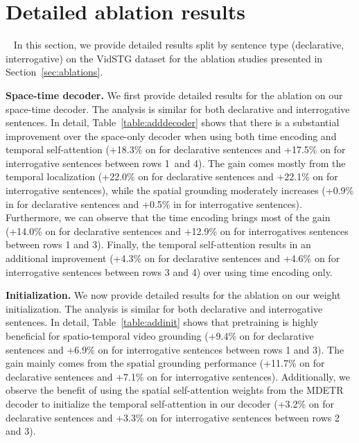 \section{Detailed ablation results}~\label{sec:addablation}
In this section, we provide detailed results split by sentence type (declarative, interrogative) on the VidSTG dataset for the ablation studies presented in Section~\ref{sec:ablations}.

\noindent \textbf{Space-time decoder.}\label{sec:adddecoderres}
We first provide detailed results for the ablation on our space-time decoder. 
The analysis is similar for both declarative and interrogative sentences.
In detail, Table~\ref{table:adddecoder} shows that there is a substantial improvement over the space-only decoder when using both time encoding and temporal self-attention (+18.3\% on  for declarative sentences and +17.5\% on  for interrogative sentences between rows 1~and 4). 
The gain comes mostly from the temporal localization (+22.0\% on  for declarative sentences and +22.1\% on  for interrogative sentences), while the spatial grounding moderately increases (+0.9\% in  for declarative sentences and +0.5\% in  for interrogative sentences). 
Furthermore, we can observe that the time encoding brings most of the gain (+14.0\% on  for declarative sentences and +12.9\% on  for interrogatives sentences between rows 1 and 3).
Finally, the temporal self-attention results in an additional improvement (+4.3\% on  for declarative sentences and +4.6\% on  for interrogative sentences between rows 3 and 4) over using time encoding only. 

\noindent \textbf{Initialization.}\label{sec:addinit}
We now provide detailed results for the ablation on our weight initialization.
The analysis is similar for both declarative and interrogative sentences.
In detail, Table~\ref{table:addinit} shows that pretraining is highly beneficial for spatio-temporal video grounding (+9.4\% on  for declarative sentences and +6.9\% on  for interrogative sentences between rows 1 and 3). 
The gain mainly comes from the spatial grounding performance (+11.7\% on  for declarative sentences and +7.1\% on  for interrogative sentences).
Additionally, we observe the benefit of using the spatial self-attention weights from the MDETR decoder to initialize the temporal self-attention in our decoder (+3.2\% on  for declarative sentences and +3.3\% on  for interrogative sentences between rows 2 and 3).

